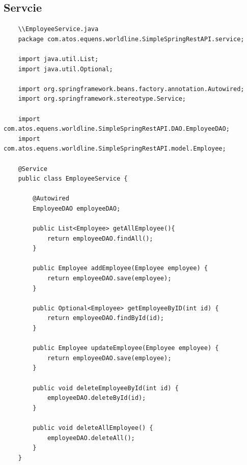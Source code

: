 \documentclass{report}
\begin{document}
	\subsection{Servcie}
	\begin{lstlisting}
	\\EmployeeService.java
	package com.atos.equens.worldline.SimpleSpringRestAPI.service;
	
	import java.util.List;
	import java.util.Optional;
	
	import org.springframework.beans.factory.annotation.Autowired;
	import org.springframework.stereotype.Service;
	
	import com.atos.equens.worldline.SimpleSpringRestAPI.DAO.EmployeeDAO;
	import com.atos.equens.worldline.SimpleSpringRestAPI.model.Employee;
	
	@Service
	public class EmployeeService {
	
		@Autowired
		EmployeeDAO employeeDAO;
	
		public List<Employee> getAllEmployee(){
			return employeeDAO.findAll();
		}
		
		public Employee addEmployee(Employee employee) {
			return employeeDAO.save(employee);
		}
		
		public Optional<Employee> getEmployeeByID(int id) {
			return employeeDAO.findById(id);
		}
		
		public Employee updateEmployee(Employee employee) {
			return employeeDAO.save(employee);
		}
		
		public void deleteEmployeeById(int id) {
			employeeDAO.deleteById(id);
		}
		
		public void deleteAllEmployee() {
			employeeDAO.deleteAll();
		}
	}
	\end{lstlisting}
\end{document}
